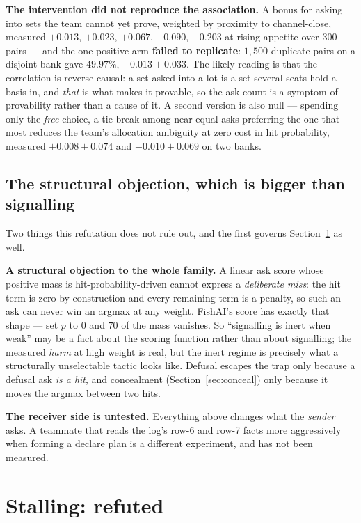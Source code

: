 \documentclass[11pt]{article}
\begin{document}
\textbf{The intervention did not reproduce the association.} A bonus for asking into sets the team
cannot yet prove, weighted by proximity to channel-close, measured $+0.013$, $+0.023$, $+0.067$,
$-0.090$, $-0.203$ at rising appetite over 300 pairs --- and the one positive arm \textbf{failed to
replicate}: $1{,}500$ duplicate pairs on a disjoint bank gave $49.97\%$, $-0.013 \pm 0.033$. The
likely reading is that the correlation is reverse-causal: a set asked into a lot is a set several
seats hold a basis in, and \emph{that} is what makes it provable, so the ask count is a symptom of
provability rather than a cause of it. A second version is also null --- spending only the
\emph{free} choice, a tie-break among near-equal asks preferring the one that most reduces the
team's allocation ambiguity at zero cost in hit probability, measured $+0.008 \pm 0.074$ and $-0.010
\pm 0.069$ on two banks.

\subsection{The structural objection, which is bigger than signalling}
\label{sec:structural}

Two things this refutation does not rule out, and the first governs Section~\ref{sec:stall} as well.

\textbf{A structural objection to the whole family.} A linear ask score whose positive mass is
hit-probability-driven cannot express a \emph{deliberate miss}: the hit term is zero by construction
and every remaining term is a penalty, so such an ask can never win an argmax at any weight.
FishAI's score has exactly that shape --- set $p$ to $0$ and $70$ of the mass vanishes. So
``signalling is inert when weak'' may be a fact about the scoring function rather than about
signalling; the measured \emph{harm} at high weight is real, but the inert regime is precisely what
a structurally unselectable tactic looks like. Defusal escapes the trap only because a defusal ask
\emph{is a hit}, and concealment (Section~\ref{sec:conceal}) only because it moves the argmax
between two hits.

\textbf{The receiver side is untested.} Everything above changes what the \emph{sender} asks. A
teammate that reads the log's row-6 and row-7 facts more aggressively when forming a declare plan is
a different experiment, and has not been measured.

\section{Stalling: refuted}
\label{sec:stall}
\end{document}
